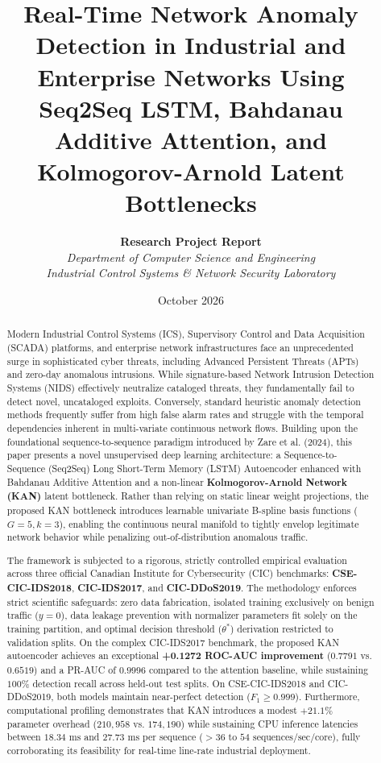 \documentclass[twocolumn]{article}
\title{\textbf{Real-Time Network Anomaly Detection in Industrial and Enterprise Networks Using Seq2Seq LSTM, Bahdanau Additive Attention, and Kolmogorov-Arnold Latent Bottlenecks}}
\author{
  \textbf{Research Project Report} \\
  \textit{Department of Computer Science and Engineering} \\
  \textit{Industrial Control Systems \& Network Security Laboratory}
}
\date{October 2026}
\begin{document}
\maketitle

\begin{abstract}
Modern Industrial Control Systems (ICS), Supervisory Control and Data Acquisition (SCADA) platforms, and enterprise network infrastructures face an unprecedented surge in sophisticated cyber threats, including Advanced Persistent Threats (APTs) and zero-day anomalous intrusions. While signature-based Network Intrusion Detection Systems (NIDS) effectively neutralize cataloged threats, they fundamentally fail to detect novel, uncataloged exploits. Conversely, standard heuristic anomaly detection methods frequently suffer from high false alarm rates and struggle with the temporal dependencies inherent in multi-variate continuous network flows. Building upon the foundational sequence-to-sequence paradigm introduced by Zare et al. (2024), this paper presents a novel unsupervised deep learning architecture: a Sequence-to-Sequence (Seq2Seq) Long Short-Term Memory (LSTM) Autoencoder enhanced with Bahdanau Additive Attention and a non-linear \textbf{Kolmogorov-Arnold Network (KAN)} latent bottleneck. Rather than relying on static linear weight projections, the proposed KAN bottleneck introduces learnable univariate B-spline basis functions ($G=5, k=3$), enabling the continuous neural manifold to tightly envelop legitimate network behavior while penalizing out-of-distribution anomalous traffic.

The framework is subjected to a rigorous, strictly controlled empirical evaluation across three official Canadian Institute for Cybersecurity (CIC) benchmarks: \textbf{CSE-CIC-IDS2018}, \textbf{CIC-IDS2017}, and \textbf{CIC-DDoS2019}. The methodology enforces strict scientific safeguards: zero data fabrication, isolated training exclusively on benign traffic ($y=0$), data leakage prevention with normalizer parameters fit solely on the training partition, and optimal decision threshold ($\theta^*$) derivation restricted to validation splits. On the complex CIC-IDS2017 benchmark, the proposed KAN autoencoder achieves an exceptional \textbf{+0.1272 ROC-AUC improvement} ($0.7791$ vs. $0.6519$) and a PR-AUC of $0.9996$ compared to the attention baseline, while sustaining $100\%$ detection recall across held-out test splits. On CSE-CIC-IDS2018 and CIC-DDoS2019, both models maintain near-perfect detection ($F_1 \ge 0.999$). Furthermore, computational profiling demonstrates that KAN introduces a modest $+21.1\%$ parameter overhead ($210,958$ vs. $174,190$) while sustaining CPU inference latencies between $18.34\text{ ms}$ and $27.73\text{ ms}$ per sequence ($>36\text{ to }54\text{ sequences/sec/core}$), fully corroborating its feasibility for real-time line-rate industrial deployment.
\end{abstract}
\end{document}
